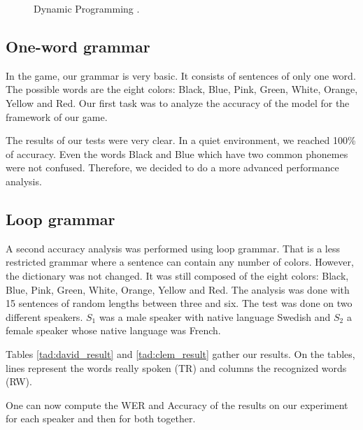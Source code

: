 \begin{figure}[h!]
\caption{Dynamic Programming \cite{dyn_prog}.}
\label{fig:dyn_prog}
\end{figure}

\subsection*{One-word grammar}
In the game, our grammar is very basic. It consists of sentences of only one word. The possible words are the eight colors: Black, Blue, Pink, Green, White, Orange, Yellow and Red. Our first task was to analyze the accuracy of the model for the framework of our game. 

The results of our tests were very clear. In a quiet environment, we reached 100\% of accuracy. Even the words Black and Blue which have two common phonemes were not confused. Therefore, we decided to do a more advanced performance analysis.

\subsection*{Loop grammar}
A second accuracy analysis was performed using loop grammar. That is a less restricted grammar where a sentence can contain any number of colors. However, the dictionary was not changed. It was still composed of the eight colors: Black, Blue, Pink, Green, White, Orange, Yellow and Red. 
The analysis was done with 15 sentences of random lengths between three and six. The test was done on two different speakers. $S_1$ was a male speaker with native language Swedish and $S_2$ a female speaker whose native language was French. 

Tables \ref{tad:david_result} and \ref{tad:clem_result} gather our results. On the tables, lines represent the words really spoken (TR) and columns the recognized words (RW).

One can now compute the WER and Accuracy of the results on our experiment for each speaker and then for both together. 

